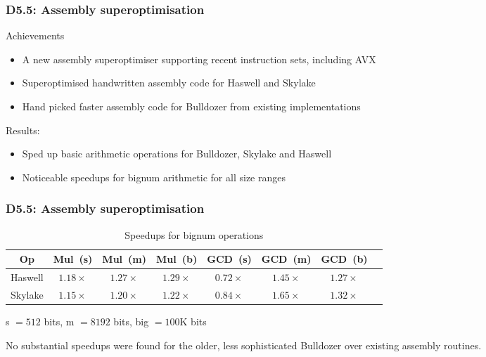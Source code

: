 \documentclass{beamer}
\begin{document}
\begin{frame}

\frametitle{D5.5: Assembly superoptimisation}

\begin{block} {Achievements}
\begin{itemize}
\item A new assembly superoptimiser supporting recent instruction sets, including AVX
\item Superoptimised handwritten assembly code for Haswell and Skylake
\item Hand picked faster assembly code for Bulldozer from existing implementations
\end{itemize}
\end{block}
\begin{block}
  {Results:}
\begin{itemize}
\item Sped up basic arithmetic operations for Bulldozer, Skylake and Haswell
\item Noticeable speedups for bignum arithmetic for all size ranges
\end{itemize}
\end{block}

\end{frame}
\begin{frame}[fragile]

\frametitle{D5.5: Assembly superoptimisation}


\begin{table}
\caption{Speedups for bignum operations}
  \begin{tabular}{cccccccc}
  \toprule
{Op} & \mbox{Mul (s)} & \mbox{Mul (m)} & \mbox{Mul (b)} & \mbox{GCD (s)} & \mbox{GCD (m)} & \mbox{GCD (b)} \\
\midrule
{Haswell} & $1.18\times$ & $1.27\times$ & $1.29\times$ & $0.72\times$ & $1.45\times$ & $1.27\times$\\
{Skylake} & $1.15\times$ & $1.20\times$ & $1.22\times$ & $0.84\times$ & $1.65\times$ & $1.32\times$ \\
\bottomrule
\end{tabular}
\end{table}

s $= 512$ bits, m $= 8192$ bits, big $= 100$K bits

No substantial speedups were found for the older, less sophisticated Bulldozer over existing assembly routines.

\end{frame}
\end{document}
